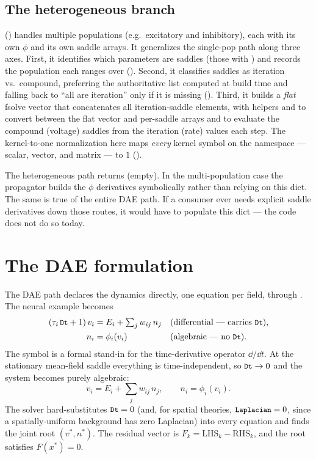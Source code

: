 \subsection{The heterogeneous branch}

 () handles multiple
populations (e.g.\ excitatory and inhibitory), each with its own $\phi$ and its
own saddle arrays. It generalizes the single-pop path along three axes. First, it
identifies which parameters are saddles (those with ) and
records the population each ranges over (). Second,
it classifies saddles as iteration vs.\ compound, preferring the authoritative
 list computed at build time and falling back to
``all are iteration'' only if it is missing ().
Third, it builds a \emph{flat} fsolve vector that concatenates all
iteration-saddle elements, with helpers  and
 to convert between the flat vector and per-saddle arrays
and to evaluate the compound (voltage) saddles from the iteration (rate) values
each step. The kernel-to-one normalization here maps \emph{every} kernel symbol
on the namespace --- scalar, vector, and matrix --- to $1$
().

\begin{note}
The heterogeneous path returns  (empty). In the
multi-population case the propagator builds the $\phi$ derivatives symbolically
rather than relying on this dict. The same is true of the entire DAE path. If a
consumer ever needs explicit saddle derivatives down those routes, it would have
to populate this dict --- the code does not do so today.
\end{note}

\section{The DAE formulation}

The DAE path declares the dynamics directly, one equation per field, through
. The neural example becomes
\begin{align}
  (\tau_i\,\texttt{\small Dt} + 1)\,v_i &= E_i + \textstyle\sum_j w_{ij}\,n_j
    && \text{(differential --- carries \texttt{\small Dt})}, \\
  n_i &= \phi_i(v_i)
    && \text{(algebraic --- no \texttt{\small Dt})}.
\end{align}
The symbol  is a formal stand-in for the time-derivative operator
$\dd/\dd t$. At the stationary mean-field saddle everything is time-independent,
so $\texttt{\small Dt}\to 0$ and the system becomes purely algebraic:
\begin{equation}
  v_i = E_i + \sum_j w_{ij}\,n_j,
  \qquad
  n_i = \phi_i(v_i).
\end{equation}
The solver hard-substitutes $\texttt{\small Dt}=0$ (and, for spatial theories,
$\texttt{\small Laplacian}=0$, since a spatially-uniform background has zero Laplacian)
into every equation and finds the joint root $(v^{*}, n^{*})$. The residual vector
is $F_k = \text{LHS}_k - \text{RHS}_k$, and the root satisfies $F(x^{*}) = 0$.


